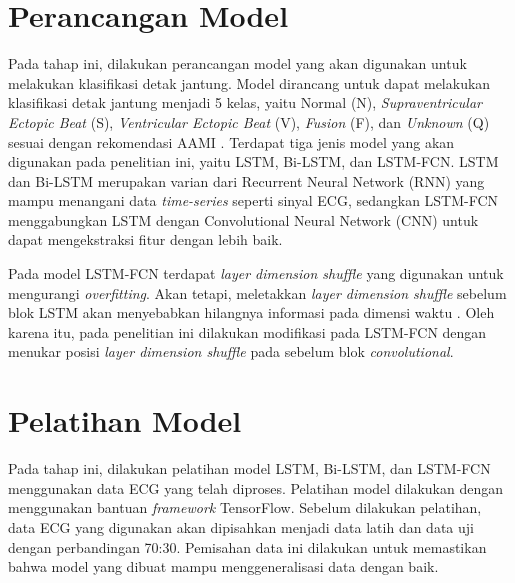 \section{Perancangan Model}
\label{subsec: metodologi-pembuatan-model}
Pada tahap ini, dilakukan perancangan model yang akan digunakan untuk melakukan klasifikasi detak jantung.
Model dirancang untuk dapat melakukan klasifikasi detak jantung menjadi 5 kelas, yaitu Normal (N), \textit{Supraventricular Ectopic Beat} (S), \textit{Ventricular Ectopic Beat} (V), \textit{Fusion} (F), dan \textit{Unknown} (Q) sesuai dengan rekomendasi AAMI \parencite{associationfortheadvancementofmedicalinstrumentationTestingReportingPerformance1998}.
Terdapat tiga jenis model yang akan digunakan pada penelitian ini, yaitu LSTM, Bi-LSTM, dan LSTM-FCN.
LSTM dan Bi-LSTM merupakan varian dari Recurrent Neural Network (RNN) yang mampu menangani data \textit{time-series} seperti sinyal ECG, sedangkan LSTM-FCN menggabungkan LSTM dengan Convolutional Neural Network (CNN) 
untuk dapat mengekstraksi fitur dengan lebih baik.

Pada model LSTM-FCN terdapat \textit{layer dimension shuffle} yang digunakan untuk mengurangi \textit{overfitting}.
Akan tetapi, meletakkan \textit{layer dimension shuffle} sebelum blok LSTM akan menyebabkan hilangnya informasi pada dimensi waktu \parencite{8713870}.
Oleh karena itu, pada penelitian ini dilakukan modifikasi pada LSTM-FCN dengan menukar posisi \textit{layer dimension shuffle} pada sebelum blok \textit{convolutional}.

\section{Pelatihan Model}
\label{subsec: metodologi-pelatihan-model}
Pada tahap ini, dilakukan pelatihan model LSTM, Bi-LSTM, dan LSTM-FCN menggunakan data ECG yang telah diproses.
Pelatihan model dilakukan dengan menggunakan bantuan \textit{framework} TensorFlow.
Sebelum dilakukan pelatihan, data ECG yang digunakan akan dipisahkan menjadi data latih dan data uji dengan perbandingan 70:30.
Pemisahan data ini dilakukan untuk memastikan bahwa model yang dibuat mampu menggeneralisasi data dengan baik.

